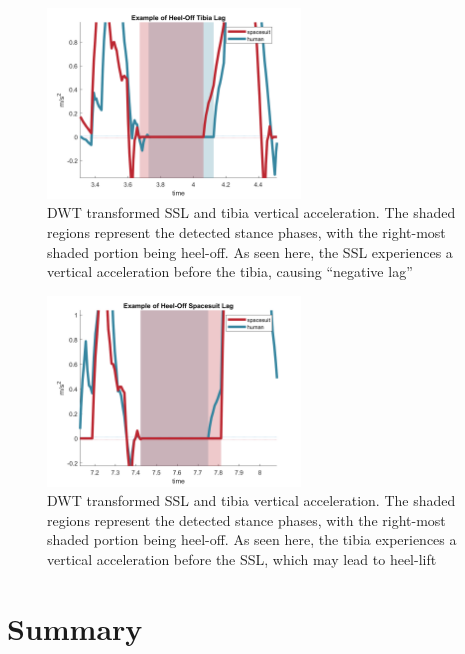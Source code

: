 \documentclass[defaultstyle,11pt]{comps}
\begin{document}
\begin{figure}
\hypertarget{fig:humanlag}{%
\centering
\includegraphics[width=0.6\textwidth,height=\textheight]{../fig/SA1/humanlag.png}
\caption{DWT transformed SSL and tibia vertical acceleration. The shaded regions represent the detected stance phases, with the right-most shaded portion being heel-off. As seen here, the SSL experiences a vertical acceleration before the tibia, causing ``negative lag''}\label{fig:humanlag}
}
\end{figure}

\begin{figure}
\hypertarget{fig:sslag}{%
\centering
\includegraphics[width=0.6\textwidth,height=\textheight]{../fig/SA1/sslag.png}
\caption{DWT transformed SSL and tibia vertical acceleration. The shaded regions represent the detected stance phases, with the right-most shaded portion being heel-off. As seen here, the tibia experiences a vertical acceleration before the SSL, which may lead to heel-lift}\label{fig:sslag}
}
\end{figure}

\hypertarget{summary-2}{%
\section{Summary}\label{summary-2}}
\end{document}
